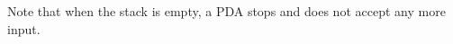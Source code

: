 

\setcounter{section}{6}
\setcounter{subsection}{2}
\setcounter{dfn}{5}


Note that when the stack is empty, a PDA stops and does not accept any more input.



